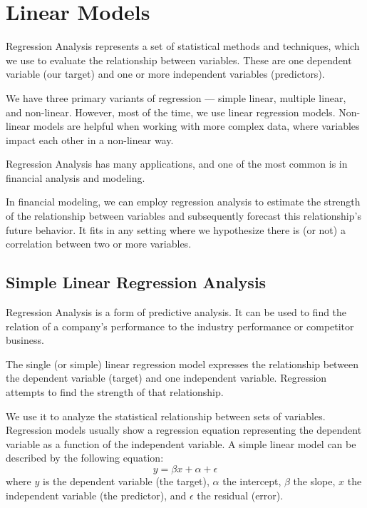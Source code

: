 \chapter{Linear Models}
\label{linear-models}

Regression Analysis represents a set of statistical methods and techniques, which we use to evaluate the relationship between variables. These are one dependent variable (our target) and one or more independent variables (predictors).

We have three primary variants of regression — simple linear, multiple linear, and non-linear. However, most of the time, we use linear regression models. Non-linear models are helpful when working with more complex data, where variables impact each other in a non-linear way.

Regression Analysis has many applications, and one of the most common is in financial analysis and modeling.

In financial modeling, we can employ regression analysis to estimate the strength of the relationship between variables and subsequently forecast this relationship’s future behavior. It fits in any setting where we hypothesize there is (or not) a correlation between two or more variables.

\section{Simple Linear Regression Analysis}
\label{sec:linear-regression}
Regression Analysis is a form of predictive analysis. It can be used to find the relation of a company’s performance to the industry performance or competitor business.

The single (or simple) linear regression model expresses the relationship between the dependent variable (target) and one independent variable. Regression attempts to find the strength of that relationship.

We use it to analyze the statistical relationship between sets of variables. Regression models usually show a regression equation representing the dependent variable as a function of the independent variable.
A simple linear model can be described by the following equation:
\begin{equation}
y = \beta x + \alpha + \epsilon
\label{eq:linear_regression}
\end{equation}
where $y$ is the dependent variable (the target), $\alpha$ the intercept, $\beta$ the slope, $x$ the independent variable (the predictor), and $\epsilon$ the residual (error).

